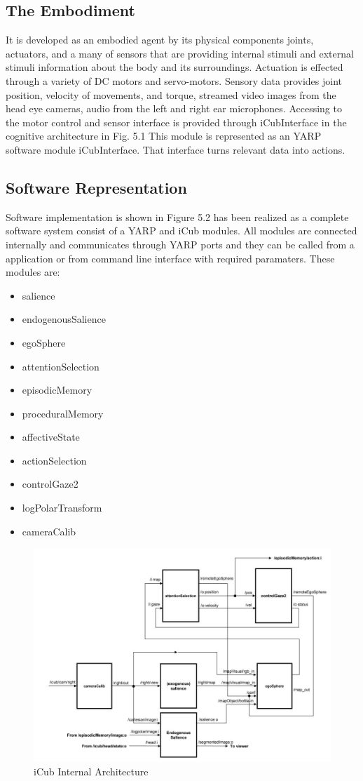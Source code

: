 \documentclass[a4paper, 11pt]{report}
\begin{document}
\subsection{The Embodiment}
It is developed as an embodied agent by its physical components joints, 
actuators, and a many of sensors that are providing internal stimuli and 
external stimuli information about the body and its surroundings. 
Actuation is effected through a variety of DC motors and servo-motors. Sensory 
data provides joint position, velocity of movements, and torque, streamed video 
images from the head eye cameras, audio from the left and right ear 
microphones\cite{David Vernon}. Accessing to the motor control and sensor 
interface is provided through iCubInterface in the cognitive architecture in 
Fig. 5.1 This module is represented as an YARP software module iCubInterface.
That interface turns relevant data into actions.
\subsection{Software Representation}
Software implementation is shown in Figure 5.2 has been realized as a complete 
software system consist of a YARP and iCub modules. All modules are connected 
internally and communicates through YARP ports and they can be called from a 
application or from command line interface with required paramaters. These 
modules are:
\begin{itemize}
  \item salience
  \item endogenousSalience
  \item egoSphere
  \item attentionSelection
  \item episodicMemory
  \item proceduralMemory
  \item affectiveState
  \item actionSelection
  \item controlGaze2
  \item logPolarTransform
  \item cameraCalib
\end{itemize}
\begin{figure}[h!]
  \centering
  \includegraphics[width=0.8\linewidth]{cognitive_architecture_A}
  \caption{iCub Internal Architecture}
  \label{fig:cognitive_architecture_A}
\end{figure} 
\newpage
\end{document}
